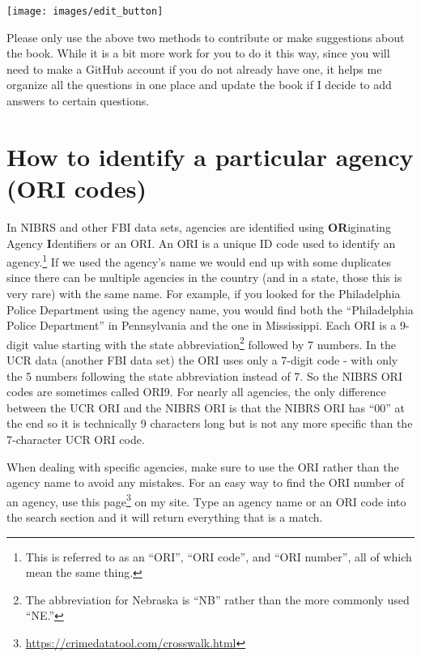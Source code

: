 \documentclass[
]{krantz}
\let\origfigure\figure
\let\endorigfigure\endfigure
\renewenvironment{figure}[1][2] {
    \expandafter\origfigure\expandafter[H]
} {
    \endorigfigure
}
\renewcommand{\href}[2]{#2\footnote{\url{#1}}}
\begin{document}
\begin{figure}

{\centering \texttt{[image: images/edit\_button]} 

}

\caption{The edit button for how to make edits of this book.}\label{fig:unnamed-chunk-3}
\end{figure}

Please only use the above two methods to contribute or make
suggestions about the book. While it is a bit more work for
you to do it this way, since you will need to make a GitHub
account if you do not already have one, it helps me organize
all the questions in one place and update the book if I
decide to add answers to certain questions.

\section{How to identify a particular agency (ORI
codes)}\label{ori}

In NIBRS and other FBI data sets, agencies are identified
using \textbf{OR}iginating Agency \textbf{I}dentifiers or an
ORI. An ORI is a unique ID code used to identify an
agency.\footnote{This is referred to as an ``ORI'', ``ORI
  code'', and ``ORI number'', all of which mean the same
  thing.} If we used the agency's name we would end up with
some duplicates since there can be multiple agencies in the
country (and in a state, those this is very rare) with the
same name. For example, if you looked for the Philadelphia
Police Department using the agency name, you would find both
the ``Philadelphia Police Department'' in Pennsylvania and
the one in Mississippi. Each ORI is a 9-digit value starting
with the state abbreviation\footnote{The abbreviation for
  Nebraska is ``NB'' rather than the more commonly used
  ``NE.''} followed by 7 numbers. In the UCR data (another
FBI data set) the ORI uses only a 7-digit code - with only
the 5 numbers following the state abbreviation instead of 7.
So the NIBRS ORI codes are sometimes called ORI9. For nearly
all agencies, the only difference between the UCR ORI and
the NIBRS ORI is that the NIBRS ORI has ``00'' at the end so
it is technically 9 characters long but is not any more
specific than the 7-character UCR ORI code.

When dealing with specific agencies, make sure to use the
ORI rather than the agency name to avoid any mistakes. For
an easy way to find the ORI number of an agency, use
\href{https://crimedatatool.com/crosswalk.html}{this page}
on my site. Type an agency name or an ORI code into the
search section and it will return everything that is a
match.
\end{document}
